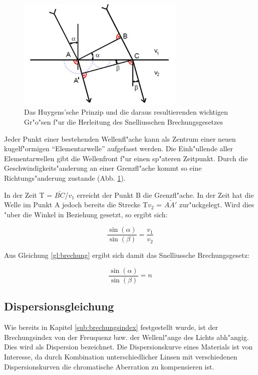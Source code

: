 	\begin{figure}[!h]
		\centering
		\includegraphics[width = 8cm]{img/huygen.jpg}
		\caption{Das Huygens'sche Prinzip und die daraus resultierenden wichtigen Gr"o"sen f"ur die Herleitung des Snelliusschen Brechungsgesetzes \cite{anleitung.}}
		\label{huygen}
	\end{figure}

	Jeder Punkt einer bestehenden Wellenfl"ache kann als Zentrum einer neuen kugelf"ormigen "`Elementarwelle"' aufgefasst werden. Die Einh"ullende aller Elementarwellen gibt die Wellenfront f"ur einen sp"ateren Zeitpunkt. Durch die Geschwindigkeits"anderung an einer Grenzfl"ache kommt so eine Richtungs"anderung zustande (Abb. \ref{huygen}).

	In der Zeit T = $\bar{BC}$/$v_\mathrm{1}$ erreicht der Punkt B die Grenzfl"ache. In der Zeit hat die Welle im Punkt A jedoch bereits die Strecke T$v_\mathrm{2}$ =  $\bar{AA'}$ zur"uckgelegt. Wird dies "uber die Winkel in Beziehung gesetzt, so ergibt sich:

	\begin{equation}
		\frac{\sin(\alpha)}{\sin(\beta)} = \frac{v_\mathrm{1}}{v_\mathrm{2}}  \label{gl:huygen}
	\end{equation}

	Aus Gleichung \eqref{gl:brechung} ergibt sich damit das Snelliussche Brechungsgesetz:

	\begin{equation}
		\frac{\sin(\alpha)}{\sin(\beta)} = n  \label{snellius}
	\end{equation}

	\subsection{Dispersionsgleichung} %
	\label{sub:dispersionsgleichung}
	
	Wie bereits in Kapitel \ref{sub:brechungsindex} festgestellt wurde, ist der Brechungsindex von der Freuquenz bzw. der Wellenl"ange des Lichts abh"angig. Dies wird als Dispersion bezeichnet. Die Dispersionskurve eines Materials ist von Interesse, da durch Kombination unterschiedlicher Linsen mit verschiedenen Dispersionskurven die chromatische Aberration zu kompensieren ist.

